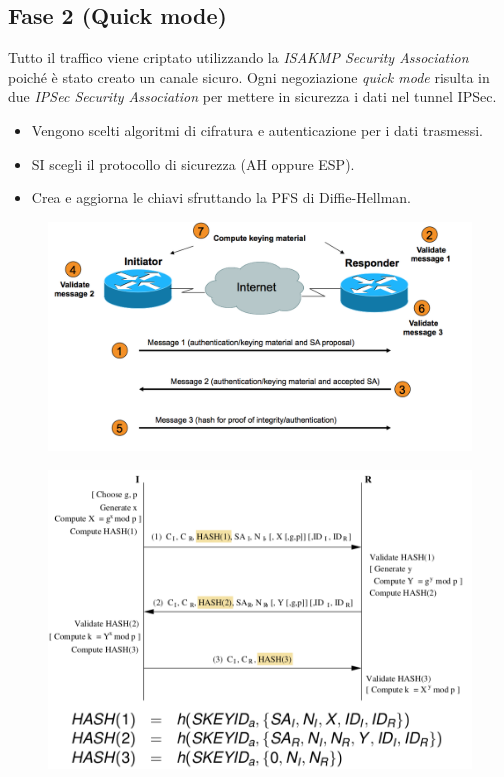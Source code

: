 \documentclass[11pt, a4paper, twoside, italian]{report}
\theoremstyle{plain}
\begin{document}
\subsection*{Fase 2 (Quick mode)}
Tutto il traffico viene criptato utilizzando la \textit{ISAKMP Security Association} poiché è stato creato un canale sicuro. Ogni negoziazione \textit{quick mode} risulta in due \textit{IPSec Security Association} per mettere in sicurezza i dati nel tunnel IPSec.
\begin{itemize}
	\item Vengono scelti algoritmi di cifratura e autenticazione per i dati trasmessi.
	\item SI scegli il protocollo di sicurezza (AH oppure ESP).
	\item Crea e aggiorna le chiavi sfruttando la PFS di Diffie-Hellman.
\end{itemize}
\begin{multicols}{2}
	\begin{figure}[H]
		\centering
		\includegraphics[scale=0.5]{ikefase2roadmap}
	\end{figure}
\columnbreak
	\begin{figure}[H]
		\centering
		\includegraphics[scale=0.45]{ikefase2quickmodemessaggi}
	\end{figure}
\end{multicols}
\end{document}
